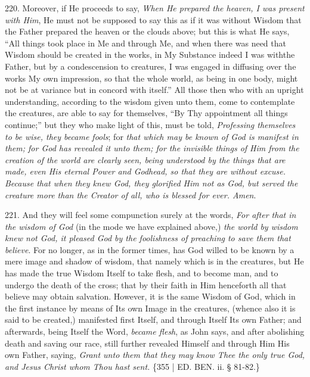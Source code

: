 220. Moreover, if He proceeds
to say, \emph{When He prepared the heaven, I was present with Him}, He
must not be supposed to say this as if it was without Wisdom that the
Father prepared the heaven or the clouds above; but this is what He
says, ``All things took place in Me and through Me, and when there was
need that Wisdom should be created in the works, in My Substance
indeed I was with\emph{}the Father, but by a condescension to
creatures, I was engaged in diffusing over the works My own
impression, so that the whole world, as being in one body, might not be at variance but in concord with itself.'' All those then who
with an upright understanding, according to the wisdom given unto
them, come to contemplate the creatures, are able to say for
themselves, ``By Thy appointment all things continue;'' but they who
make light of this, must be told, \emph{Professing themselves to be wise,
they became fools}; for \emph{that which may be known of God is
manifest in them; for God has revealed it unto them; for the invisible
things of Him from the creation of the world are clearly seen, being
understood by the things that are made, even His eternal Power and
Godhead, so that they are without excuse. Because that when they knew
God, they glorified Him not as God, but served the creature more than
the Creator of all, who is blessed for ever. Amen}.

221. And they will feel some
compunction surely at the words, \emph{For after that in the wisdom of
God} (in the mode we have explained above,) \emph{the world by wisdom
knew not God, it pleased God by the foolishness of preaching to save
them that believe}. For no longer, as in the former times, has God
willed to be known by a mere image and shadow of wisdom, that namely
which is in the creatures, but He has made the true Wisdom Itself to
take flesh, and to become man, and to undergo the death of the cross;
that by their faith in Him henceforth all that believe may obtain
salvation. However, it is the same Wisdom of God, which in the first
instance by means of Its own Image in the creatures, (whence also it
is said to be created,) manifested first Itself, and through Itself
Its own Father; and afterwards, being Itself the Word, \emph{became flesh},
as John says, and after abolishing death and saving our race, still
further revealed Himself and through Him His own Father, saying, \emph{Grant
unto them that they may know Thee the only true God, and Jesus Christ
whom Thou hast sent.} \{355 | ED.
BEN.
ii. § 81-82.\}

